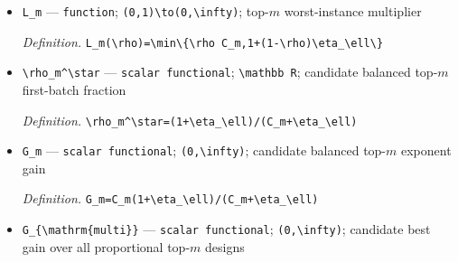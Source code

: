 \documentclass{article}
\begin{document}
\begin{itemize}
  \par\smallskip\noindent\emph{Definition.} \texttt{\textbackslash{}\allowbreak{}eta\_\allowbreak{}\textbackslash{}\allowbreak{}ell=\allowbreak{}\textbackslash{}\allowbreak{}zeta\_\allowbreak{}\textbackslash{}\allowbreak{}ell/\allowbreak{}(1-\allowbreak{}\textbackslash{}\allowbreak{}zeta\_\allowbreak{}\textbackslash{}\allowbreak{}ell)}
  \item \texttt{L\_\allowbreak{}m} --- \texttt{function}; \texttt{(0,\allowbreak{}1)\textbackslash{}\allowbreak{}to(0,\allowbreak{}\textbackslash{}\allowbreak{}infty)}; top-\(m\) worst-instance multiplier
  \par\smallskip\noindent\emph{Definition.} \texttt{L\_\allowbreak{}m(\textbackslash{}\allowbreak{}rho)=\allowbreak{}\textbackslash{}\allowbreak{}min\textbackslash{}\allowbreak{}\{\textbackslash{}\allowbreak{}rho C\_\allowbreak{}m,\allowbreak{}1+\allowbreak{}(1-\allowbreak{}\textbackslash{}\allowbreak{}rho)\textbackslash{}\allowbreak{}eta\_\allowbreak{}\textbackslash{}\allowbreak{}ell\textbackslash{}\allowbreak{}\}\allowbreak{}}
  \item \texttt{\textbackslash{}\allowbreak{}rho\_\allowbreak{}m\textasciicircum{}\textbackslash{}\allowbreak{}star} --- \texttt{scalar functional}; \texttt{\textbackslash{}\allowbreak{}mathbb R}; candidate balanced top-\(m\) first-batch fraction
  \par\smallskip\noindent\emph{Definition.} \texttt{\textbackslash{}\allowbreak{}rho\_\allowbreak{}m\textasciicircum{}\textbackslash{}\allowbreak{}star=\allowbreak{}(1+\allowbreak{}\textbackslash{}\allowbreak{}eta\_\allowbreak{}\textbackslash{}\allowbreak{}ell)/\allowbreak{}(C\_\allowbreak{}m+\allowbreak{}\textbackslash{}\allowbreak{}eta\_\allowbreak{}\textbackslash{}\allowbreak{}ell)}
  \item \texttt{G\_\allowbreak{}m} --- \texttt{scalar functional}; \texttt{(0,\allowbreak{}\textbackslash{}\allowbreak{}infty)}; candidate balanced top-\(m\) exponent gain
  \par\smallskip\noindent\emph{Definition.} \texttt{G\_\allowbreak{}m=\allowbreak{}C\_\allowbreak{}m(1+\allowbreak{}\textbackslash{}\allowbreak{}eta\_\allowbreak{}\textbackslash{}\allowbreak{}ell)/\allowbreak{}(C\_\allowbreak{}m+\allowbreak{}\textbackslash{}\allowbreak{}eta\_\allowbreak{}\textbackslash{}\allowbreak{}ell)}
  \item \texttt{G\_\allowbreak{}\{\textbackslash{}\allowbreak{}mathrm\{multi\}\allowbreak{}\}\allowbreak{}} --- \texttt{scalar functional}; \texttt{(0,\allowbreak{}\textbackslash{}\allowbreak{}infty)}; candidate best gain over all proportional top-\(m\) designs

\end{itemize}
\end{document}
